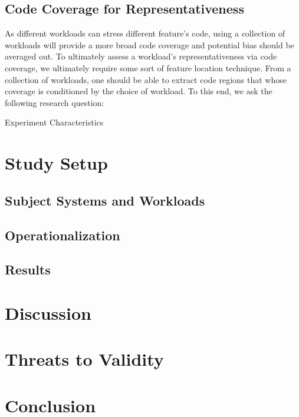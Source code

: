 \subsection{Code Coverage for Representativeness}
As different workloads can stress different feature's code, using a collection of workloads will provide a more broad code coverage and potential bias should be averaged out. To ultimately assess a workload's representativeness via code coverage, we ultimately require some sort of feature location technique. From a collection of workloads, one should be able to extract code regions that whose coverage is conditioned by the choice of workload. To this end, we ask the following research question:



\begin{table*}
	\centering
	\caption{Experiment Characteristics}
	
	\label{tab:subject_systems}
\end{table*}



\section{Study Setup}
\subsection{Subject Systems and Workloads}
\subsection{Operationalization}
\subsection{Results}

\section{Discussion}

\section{Threats to Validity}

\section{Conclusion}
